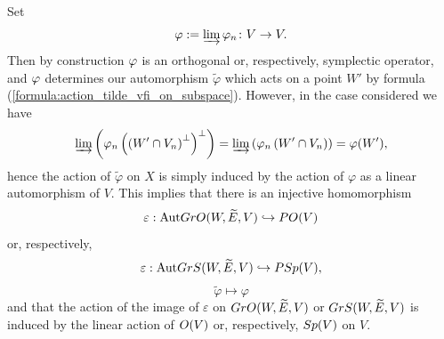 \documentclass[11pt, a4paper]{article}
\begin{document}

Set  %
\begin{equation*}
    \varphi:=\varinjlim\varphi_n\colon V\rightarrow V.
\end{equation*}
Then by construction $\varphi$
is an orthogonal or, respectively, symplectic operator, and $\varphi$ determines our automorphism $\widetilde{\varphi}$ which acts on a point $W'$ by formula (\ref{formula:action_tilde_vfi_on_subspace}). However, in the case considered we have \begin{equation}\label{formula:phi^-1_V_as_a_inductive_limit}
	\varinjlim \left(\varphi_n\left(\left(W'\cap V_n\right)^\perp\right)^\perp\right)=\varinjlim \left(\varphi_n\left(W'\cap V_n\right)\right)=\varphi(W'),
\end{equation}
hence the action of $\widetilde{\varphi}$ on $X$ is simply induced by the action of $\varphi$ as a linear automorphism of $V$. This implies that there is an injective homomorphism \begin{equation*}
    \varepsilon:\mathrm{Aut}GrO(W,\widetilde{E},V)\hookrightarrow PO(V)
\end{equation*} or, respectively,
\begin{equation*}
    \varepsilon:\mathrm{Aut}GrS(W,\widetilde{E},V)\hookrightarrow PSp(V), 
\end{equation*}
    \begin{equation*}\widetilde{\varphi}\longmapsto \varphi
\end{equation*}
and that the action of the image of $\varepsilon$ on $GrO(W,\widetilde{E},V)$ or $GrS(W,\widetilde{E},V)$ is induced by the linear action of $O(V)$ or, respectively, $Sp(V)$ on $V$.
\end{document}
